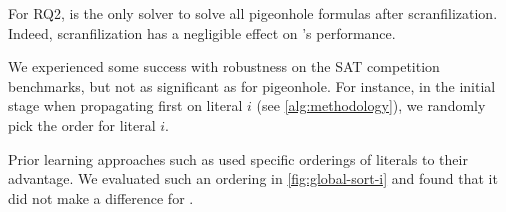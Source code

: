  
For RQ2, \tool is the only solver to solve all pigeonhole formulas after
scranfilization. Indeed, scranfilization has a negligible effect on \tool's
performance.

We experienced some success with robustness on the SAT competition benchmarks,
but not as significant as for pigeonhole. For instance, in the initial stage
when propagating first on literal $i$ (see \autoref{alg:methodology}), we
randomly pick the order for literal $i$.

Prior \pr learning approaches such as \prelearn used specific orderings of
literals to their advantage. We evaluated such an ordering in
\autoref{fig:global-sort-i} and found that it did not make a difference for
\tool.

